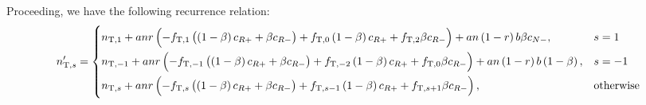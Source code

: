 \documentclass{article}
\newcommand{\tT}{\text{T}}
\begin{document}
Proceeding, we have the following recurrence relation:
%
\begin{equation*}
    n^\prime_{\tT, s} =
        \begin{dcases}
            n_{\tT, 1}
            + a n r \del{
                - f_{\tT, 1} \del{\del{1 - \beta} c_{R +} + \beta c_{R -}}
                + f_{\tT, 0} \del{1 - \beta} c_{R +}
                + f_{\tT, 2} \beta c_{R -}
            }
            + a n \del{1 - r} b \beta c_{N -}
            , &s = 1 \\
            n_{\tT, -1}
            + a n r \del{
                - f_{\tT, -1} \del{\del{1 - \beta} c_{R +} + \beta c_{R -}}
                + f_{\tT, -2} \del{1 - \beta} c_{R +}
                + f_{\tT, 0} \beta c_{R -}
            }
            + a n \del{1 - r} b \del{1 - \beta}
            , &s = -1 \\
            n_{\tT, s}
            + a n r \del{
                - f_{\tT, s} \del{\del{1 - \beta} c_{R +} + \beta c_{R -}}
                + f_{\tT, s - 1} \del{1 - \beta} c_{R +}
                + f_{\tT, s + 1} \beta c_{R -}
            }
            , &\text{otherwise}
        \end{dcases}
\end{equation*}
\end{document}
